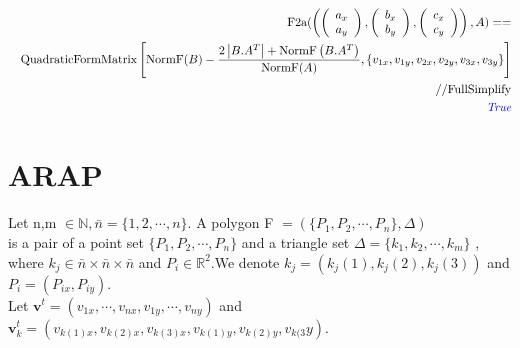 \documentclass[8pt]{article}
\begin{document}
\begin{screen}
\begin{eqnarray*}
&& 
\text{F2a}(
\left(
\left( \begin{array}{c} a_{x} \\ a_{y} \end{array} \right),
\left( \begin{array}{c} b_{x} \\ b_{y} \end{array} \right),
\left( \begin{array}{c} c_{x} \\ c_{y} \end{array} \right)
\right), A
) == \\
 &&
\text{QuadraticFormMatrix}\left[
 \text{NormF}(B)- \frac{2 \left| B.A^T \right|
 +\text{NormF} \left(B.A^T\right)}{\text{NormF}(A)}
,\left\{v_{1 x},v_{1 y},v_{2 x},v_{2 y},v_{3 x},v_{3
  y}\right\}\right] \\
 && // \text{FullSimplify} \\
 && \text{\it \color{blue}True}
\end{eqnarray*}
\end{screen}


\section{ARAP}

Let n,m $ \in \mathbb{N} ,\bar{n} = \{ 1,2, \cdots ,n \}.$ A polygon F $ = ( \{P_1,P_2, \cdots ,P_n\}, \Delta  ) $ \\
is a pair of a point set  $\{ P_1,P_2, \cdots ,P_n\}$ and a triangle set $ \Delta = \{ k_1,k_2, \cdots ,k_m\} $ ,\\
where $ k_j \in \bar{n} \times \bar{n} \times\bar{n}$ and $ P_i \in \mathbb{R}^2$.We denote $k_j = (k_j(1),k_j(2),k_j(3))$  and  $P_i = (P_{ix},P_{iy}).$\\
Let $\mathbf{v}^t = (v_{1x}, \cdots ,v_{nx},v_{1y}, \cdots ,v_{ny})$ and $\mathbf{v}_k^t = (v_{k(1)x},v_{k(2)x},v_{k(3)x},v_{k(1)y},v_{k(2)y},v_{k(3}y)$. \\
\end{document}
